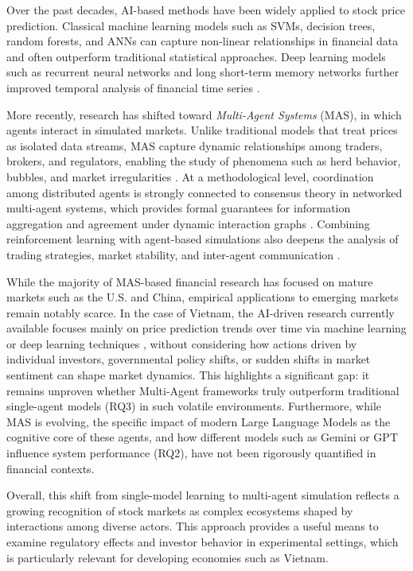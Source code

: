 \documentclass{ieeeaccess}
\begin{document}
Over the past decades, AI-based methods have been widely applied to stock price prediction. Classical machine learning models such as SVMs, decision trees, random forests, and ANNs can capture non-linear relationships in financial data and often outperform traditional statistical approaches\cite{kim2003,huang2005,patel2015}. Deep learning models such as recurrent neural networks and long short-term memory networks further improved temporal analysis of financial time series \cite{fischer2018,chen2015}.

More recently, research has shifted toward \textit{Multi-Agent Systems} (MAS), in which agents interact in simulated markets. Unlike traditional models that treat prices as isolated data streams, MAS capture dynamic relationships among traders, brokers, and regulators, enabling the study of phenomena such as herd behavior, bubbles, and market irregularities \cite{lebaron2006,chen2012}. At a methodological level, coordination among distributed agents is strongly connected to consensus theory in networked multi-agent systems, which provides formal guarantees for information aggregation and agreement under dynamic interaction graphs \cite{olfati2007consensus,ren2005consensus}. Combining reinforcement learning with agent-based simulations also deepens the analysis of trading strategies, market stability, and inter-agent communication \cite{tesfatsion2006,wang2021}.

While the majority of MAS-based financial research has focused on mature markets such as the U.S. and China, empirical applications to emerging markets remain notably scarce. In the case of Vietnam, the AI-driven research currently available focuses mainly on price prediction trends over time via machine learning or deep learning techniques \cite{tran2020forecasting,pham2023lstm}, without considering how actions driven by individual investors, governmental policy shifts, or sudden shifts in market sentiment can shape market dynamics. This highlights a significant gap: it remains unproven whether Multi-Agent frameworks truly outperform traditional single-agent models (RQ3) in such volatile environments. Furthermore, while MAS is evolving, the specific impact of modern Large Language Models as the cognitive core of these agents, and how different models such as Gemini or GPT influence system performance (RQ2), have not been rigorously quantified in financial contexts.

Overall, this shift from single-model learning to multi-agent simulation reflects a growing recognition of stock markets as complex ecosystems shaped by interactions among diverse actors. This approach provides a useful means to examine regulatory effects and investor behavior in experimental settings, which is particularly relevant for developing economies such as Vietnam.
\end{document}
